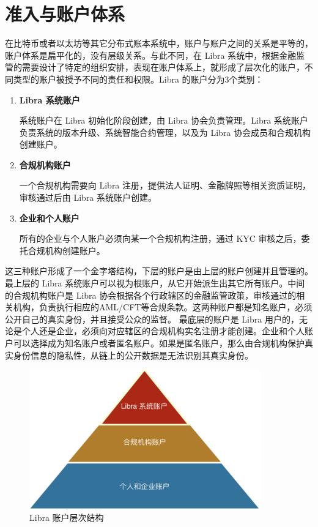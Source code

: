 \section{准入与账户体系}\label{sec:hierarchy}

在比特币或者以太坊等其它分布式账本系统中，账户与账户之间的关系是平等的，账户体系是扁平化的，没有层级关系。与此不同，在 Libra 系统中，根据金融监管的需要设计了特定的组织安排，表现在账户体系上，就形成了层次化的账户，不同类型的账户被授予不同的责任和权限。Libra 的账户分为3个类别：

\begin{enumerate}
    \item \textbf{Libra 系统账户}

        系统账户在 Libra 初始化阶段创建，由 Libra 协会负责管理。Libra 系统账户负责系统的版本升级、系统智能合约管理，以及为 Libra 协会成员和合规机构创建账户。
        
    \item \textbf{合规机构账户}

        一个合规机构需要向 Libra 注册，提供法人证明、金融牌照等相关资质证明，审核通过后由 Libra 系统账户创建。

    \item \textbf{企业和个人账户}
    
        所有的企业与个人账户必须向某一个合规机构注册，通过 KYC 审核之后，委托合规机构创建账户。
    
\end{enumerate}

这三种账户形成了一个金字塔结构，下层的账户是由上层的账户创建并且管理的。最上层的 Libra 系统账户可以视为根账户，从它开始派生出其它所有账户。中间的合规机构账户是 Libra 协会根据各个行政辖区的金融监管政策，审核通过的相关机构，负责执行相应的AML/CFT等合规条款。这两种账户都是知名账户，必须公开自己的真实身份，并且接受公众的监督。
最底层的账户是 Libra 用户的，无论是个人还是企业，必须向对应辖区的合规机构实名注册才能创建。企业和个人账户可以选择成为知名账户或者匿名账户。如果是匿名账户，那么由合规机构保护真实身份信息的隐私性，从链上的公开数据是无法识别其真实身份。

\begin{figure}[h!]
    \centering
    \includegraphics[width=10cm, keepaspectratio]{images/ledger_hierarchy.png}
    \caption{Libra 账户层次结构}
    \label{fig:hierarchy}
\end{figure}
